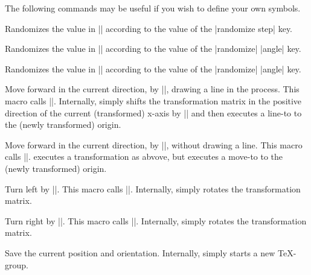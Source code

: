 \begin{command}{\pgfdeclarelindenmayersystem{}}
\begin{command}{\symbol{}}
The following commands may be useful if you wish to define your own
symbols.

\begin{command}{\pgflsystemrandomizestep}
	Randomizes the value in |\pgflsystemstep| according to the value of
	the |randomize step| key.
\end{command}

\begin{command}{\pgflsystemrandomizeleftangle}
	Randomizes the value in |\pgflsystemleftangle| according to the value of
	the |randomize| |angle| key.
\end{command}

\begin{command}{\pgflsystemrandomizerightangle}
	Randomizes the value in |\pgflsystemrightangle| according to the value of
	the |randomize| |angle| key.
\end{command}

\begin{command}{\pgflsystemdrawforward}
	Move forward in the current direction, by |\pgflsystemstep|,
	drawing a line in the process. This macro calls 
	|\pgflsystemrandomizestep|. Internally, \pgfname{} simply
	shifts the transformation matrix in the positive direction of 
	the current (transformed) x-axis by |\pgflsystemstep| 
	and then executes	a line-to to the (newly transformed) origin.
\end{command}

\begin{command}{\pgflsystemmoveforward}
	Move forward in the current direction, by |\pgflsystemstep|,
	without drawing a line. This macro calls 
	|\pgflsystemrandomizestep|. \pgfname{} executes a transformation
	as abvove, but executes	a move-to to the (newly transformed) 
	origin.
\end{command}

\begin{command}{\pgflsystemturnleft}
  Turn left by |\pgflsystemleftangle|. This macro calls 
	|\pgflsystemrandomizeleftangle|. Internally, \pgfname{}
	simply rotates the transformation matrix.
\end{command}

\begin{command}{\pgflsystemturnright}
	Turn right by |\pgflsystemrightangle|. This macro calls 
	|\pgflsystemrandomizerightangle|. Internally, \pgfname{}
	simply rotates the transformation matrix.
\end{command}

\begin{command}{\pgflsystemsavestate}
	Save the current position and orientation. Internally,
	\pgfname{} simply starts a new \TeX-group. 
\end{command}


\end{command}
\end{command}
